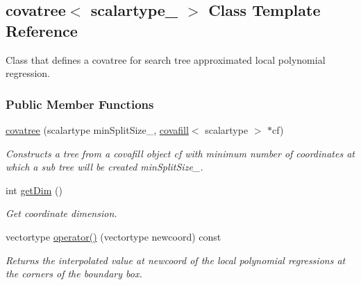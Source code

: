 \hypertarget{classcovatree}{}\subsection{covatree$<$ scalartype\+\_\+ $>$ Class Template Reference}
\label{classcovatree}


Class that defines a covatree for search tree approximated local polynomial regression.  


\subsubsection*{Public Member Functions}
\begin{DoxyCompactItemize}
\item 
\hypertarget{classcovatree_af2e211e962e7c21cdf55dd2c9c87ed17}{}\hyperlink{classcovatree_af2e211e962e7c21cdf55dd2c9c87ed17}{covatree} (scalartype min\+Split\+Size\+\_\+, \hyperlink{classcovafill}{covafill}$<$ scalartype $>$ $\ast$cf)\label{classcovatree_af2e211e962e7c21cdf55dd2c9c87ed17}

\begin{DoxyCompactList}\small\item\em Constructs a tree from a covafill object {\itshape cf} with minimum number of coordinates at which a sub tree will be created {\itshape min\+Split\+Size\+\_\+}. \end{DoxyCompactList}\item 
\hypertarget{classcovatree_a3bc91d5b1516c0ac0b4c9f02e871ef06}{}int \hyperlink{classcovatree_a3bc91d5b1516c0ac0b4c9f02e871ef06}{get\+Dim} ()\label{classcovatree_a3bc91d5b1516c0ac0b4c9f02e871ef06}

\begin{DoxyCompactList}\small\item\em Get coordinate dimension. \end{DoxyCompactList}\item 
\hypertarget{classcovatree_a2fd5facb6a97d7356428ef07141c6481}{}vectortype \hyperlink{classcovatree_a2fd5facb6a97d7356428ef07141c6481}{operator()} (vectortype newcoord) const \label{classcovatree_a2fd5facb6a97d7356428ef07141c6481}

\begin{DoxyCompactList}\small\item\em Returns the interpolated value at {\itshape newcoord} of the local polynomial regressions at the corners of the boundary box. \end{DoxyCompactList}\end{DoxyCompactItemize}


